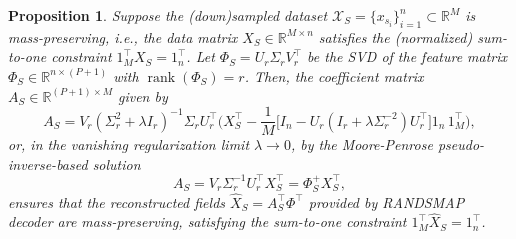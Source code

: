 \documentclass{article}
\newtheorem{prop}{Proposition}
\begin{document}
\begin{prop} \label{prp:RANDSMAP}
Suppose the (down)sampled dataset $\mathcal{X}_S=\{x_{s_i}\}_{i=1}^n\subset\mathbb{R}^M$ is mass-preserving, i.e., the data matrix $X_S \in \mathbb{R}^{M \times n}$ satisfies the (normalized) sum-to-one constraint $1_M^\top X_S = 1_n^\top$. Let $\Phi_S = U_r\Sigma_r V_r^\top$ be the SVD of the feature matrix $\Phi_S\in\mathbb{R}^{n\times (P+1)}$ with $\operatorname{rank}(\Phi_S)=r$. Then, the coefficient matrix $A_S\in\mathbb{R}^{(P+1)\times M}$ given by 
\begin{equation}
A_S=V_r(\Sigma^2_r+\lambda I_r)^{-1}\Sigma_r U^{\top}_r\big(X^{\top}_S-\frac{1}{M}\big[I_n-U_r(I_r + \lambda \Sigma^{-2}_r)U^{\top}_r\big]1_n\,1_M^\top\big),
    \label{eq:ShurAfinal0}
\end{equation}
or, in the vanishing regularization limit $\lambda \to 0$, by the Moore-Penrose pseudo-inverse-based solution
\begin{equation} A_S=V_r\Sigma^{-1}_rU^{\top}_rX^{\top}_S=\Phi_S^{+}X^{\top}_S,
    \label{eq:ShurAfinal0s}
\end{equation}
ensures that the reconstructed fields $\widehat{X}_S = A^{\top}_S \Phi^\top$ provided by RANDSMAP decoder are mass-preserving, satisfying the sum-to-one constraint $1_M^\top\widehat{X}_S=1_n^\top$.
\end{prop}
\end{document}
